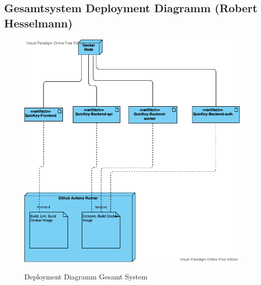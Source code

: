 \subsection*{Gesamtsystem Deployment Diagramm (Robert Hesselmann)}
\begin{figure}[hbt!]
    \begin{minipage}[t]{1\textwidth} %
        \caption{Deployment Diagramm Gesamt System} %
        \includegraphics[width=1\textwidth]{img/deployment_system.png}\\ %
    \end{minipage}
\end{figure}
